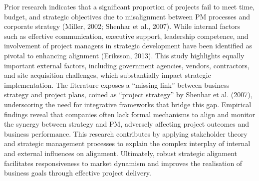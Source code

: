 \documentclass{report}
\begin{document}
Prior research indicates that a significant proportion of projects fail to meet time, budget, and strategic objectives due to misalignment between PM processes and corporate strategy (Miller, 2002; Shenhar et al., 2007). While internal factors such as effective communication, executive support, leadership competence, and involvement of project managers in strategic development have been identified as pivotal to enhancing alignment (Eriksson, 2013). This study highlights equally important external factors, including government agencies, vendors, contractors, and site acquisition challenges, which substantially impact strategic implementation. The literature exposes a “missing link” between business strategy and project plans, coined as “project strategy” by Shenhar et al. (2007), underscoring the need for integrative frameworks that bridge this gap. Empirical findings reveal that companies often lack formal mechanisms to align and monitor the synergy between strategy and PM, adversely affecting project outcomes and business performance. This research contributes by applying stakeholder theory and strategic management processes to explain the complex interplay of internal and external influences on alignment. Ultimately, robust strategic alignment facilitates responsiveness to market dynamism and improves the realisation of business goals through effective project delivery.
\end{document}
